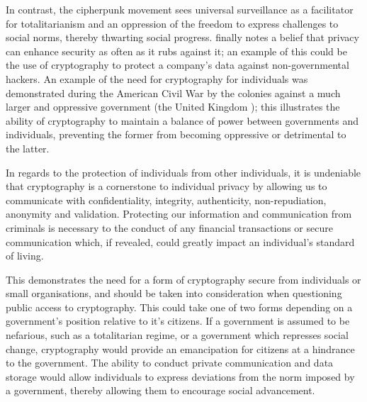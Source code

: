 \documentclass[british,10pt,a4paper]{article}
\begin{document}
In contrast, the cipherpunk movement \cite{Rogaway} sees universal surveillance as a facilitator for totalitarianism and an oppression of the freedom to express challenges to social norms, thereby thwarting social progress. \citeauthor{Rogaway} finally notes a belief that privacy can enhance security as often as it rubs against it; an example of this could be the use of cryptography to protect a company's data against non-governmental hackers. An example of the need for cryptography for individuals was demonstrated during the American Civil War by the colonies against a much larger and oppressive government (the United Kingdom \cite{us_cipher}); this illustrates the ability of cryptography to maintain a balance of power between governments and individuals, preventing the former from becoming oppressive or detrimental to the latter. 

In regards to the protection of individuals from other individuals, it is undeniable that cryptography is a cornerstone to individual privacy by allowing us to communicate with confidentiality, integrity, authenticity, non-repudiation, anonymity and validation. Protecting our information and communication from criminals is necessary to the conduct of any financial transactions or secure communication which, if revealed, could greatly impact an individual's standard of living. 

This demonstrates the need for a form of cryptography secure from individuals or small organisations, and should be taken into consideration when questioning public access to cryptography. This could take one of two forms depending on a government's position relative to it's citizens. If a government is assumed to be nefarious, such as a totalitarian regime, or a government which represses social change, cryptography would provide an emancipation for citizens at a hindrance to the government. The ability to conduct private communication and data storage would allow individuals to express deviations from the norm imposed by a government, thereby allowing them to encourage social advancement.
\end{document}
